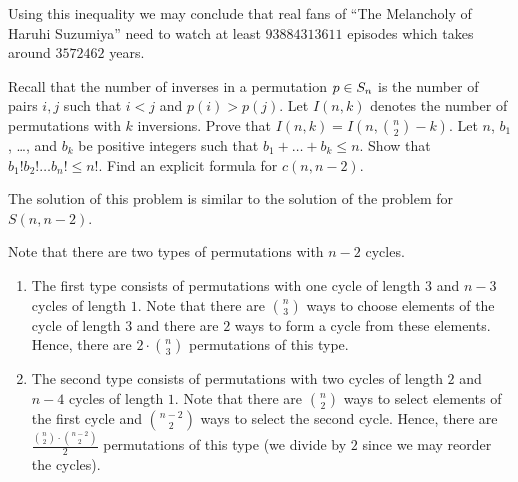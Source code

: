 Using this inequality we may conclude that real fans of
``The Melancholy of Haruhi Suzumiya'' need to watch at least $93884313611$
episodes which takes around $3572462$ years.


\begin{chapterendexercises}
  \exercise[recommended] Recall that the number of inverses in a permutation 
    $p \in S_{n}$ is the number of pairs $i, j$ such that $i < j$ and 
    $p(i) > p(j)$. Let $I(n, k)$ denotes the number of permutations with $k$
    inversions. Prove that $I(n, k) = I(n, \binom{n}{2} - k)$.
  \exercise Let $n$, $b_1$, \dots, and $b_k$ be positive integers such that 
    $b_1 + \dots + b_k \le n$. Show that $b_1! b_2! \dots b_n! \le n!$.
  \exercise[recommended] Find an explicit formula for $c(n, n - 2)$.
    \begin{solution}
      The solution of this problem is similar to the solution of the problem for
      $S(n, n - 2)$.

      Note that there are two types of permutations with $n - 2$ cycles.
      \begin{enumerate}
        \item The first type consists of permutations with one cycle of length
          $3$ and $n - 3$ cycles of length $1$. Note that there are $\binom{n}{3}$
          ways to choose elements of the cycle of length $3$ and there are $2$
          ways to form a cycle from these elements. Hence, there are $2 \cdot
          \binom{n}{3}$ permutations of this type.
        \item The second type consists of permutations with two cycles of length $2$
          and $n - 4$ cycles of length $1$. Note that there are $\binom{n}{2}$
          ways to select elements of the first cycle and $\binom{n - 2}{2}$ ways
          to select the second cycle. Hence, there are $\frac{\binom{n}{2} \cdot
          \binom{n - 2}{2}}{2}$ permutations of this type (we divide by $2$ since
          we may reorder the cycles).
      \end{enumerate}


\end{solution}
\end{chapterendexercises}
